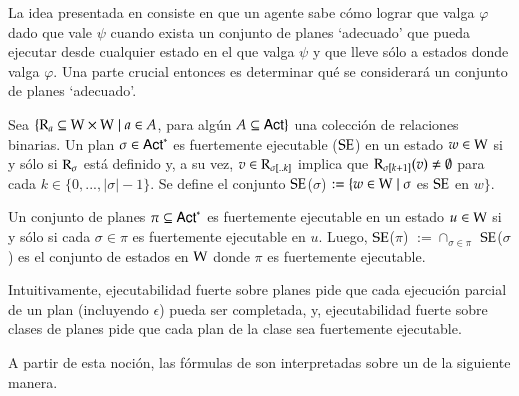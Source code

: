 La idea presentada en \cite{ArecesFSV25} consiste en que un agente sabe cómo lograr que valga $\varphi$ dado que vale $\psi$ cuando exista un 
conjunto de planes `adecuado' que pueda ejecutar desde cualquier estado en el que valga $\psi$ y que lleve sólo a estados donde valga $\varphi$. 
Una parte crucial entonces es determinar qué se considerará un conjunto de planes `adecuado'.

\begin{definicion}
    Sea $\{\mathrm{R}_a \subseteq \mathrm{W} \times \mathrm{W} \mid a \in A$, para algún $A \subseteq {\rm \sf Act}\}$ una colección de relaciones binarias. Un plan $\sigma \in {\rm \sf Act}^*$
    es fuertemente ejecutable ($\mathrm{SE}$) en un estado $w \in \mathrm{W}$ si y sólo si $\mathrm{R}_\sigma$ está definido y, a su vez, $v \in \mathrm{R}_{\sigma[..k]}$ implica que 
    $\mathrm{R}_{\sigma[k+1]}(v) \neq \emptyset$ para cada $k \in \{0,...,|\sigma|-1\}$. Se define el conjunto $\mathrm{SE}$($\sigma$) $:= \{w \in \mathrm{W} \mid \sigma$ es $\mathrm{SE}$ en $w\}$.
    
    Un conjunto de planes $\pi \subseteq {\rm \sf Act}^*$ es fuertemente ejecutable en un estado $u \in \mathrm{W}$ si y sólo si cada $\sigma \in \pi$ es fuertemente ejecutable en $u$.
    Luego, $\mathrm{SE}$($\pi$) $:= \cap_{\sigma \in \pi}$ $\mathrm{SE}$($\sigma$) es el conjunto de estados en $\mathrm{W}$ donde $\pi$ es fuertemente ejecutable. 

\end{definicion}

Intuitivamente, ejecutabilidad fuerte sobre planes pide que cada ejecución parcial de un plan (incluyendo $\epsilon$) pueda ser completada, y, ejecutabilidad fuerte sobre
clases de planes pide que cada plan de la clase sea fuertemente ejecutable.

A partir de esta noción, las fórmulas de \KHilogic son interpretadas sobre un \ults de la siguiente manera.

